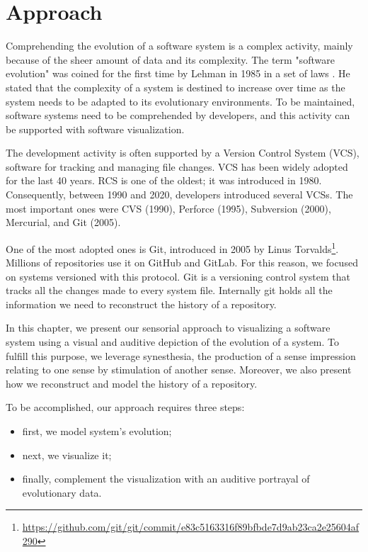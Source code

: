 
\chapter[Approach]{Approach}
\graphicspath{ {images/approach} }

Comprehending the evolution of a software system is a complex activity, mainly because of the sheer amount of data and its complexity. 
The term "software evolution" was coined for the first time by Lehman in 1985 in a set of laws \cite{Lehman1985}.
He stated that the complexity of a system is destined to increase over time as the system needs to be adapted to its evolutionary environments. 
To be maintained, software systems need to be comprehended by developers, and this activity can be supported with software visualization. 

The development activity is often supported by a Version Control System (VCS), software for tracking and managing file changes. VCS has been widely adopted for the last 40 years. RCS is one of the oldest; it was introduced in 1980. Consequently, between 1990 and 2020, developers introduced several VCSs. The most important ones were CVS (1990), Perforce (1995), Subversion (2000), Mercurial, and Git (2005).

One of the most adopted ones is Git, introduced in 2005 by Linus Torvalds\footnote{\url{https://github.com/git/git/commit/e83c5163316f89bfbde7d9ab23ca2e25604af290}}. Millions of repositories use it on GitHub and GitLab. 
For this reason, we focused on systems versioned with this protocol.
Git is a versioning control system that tracks all the changes made to every system file. 
Internally git holds all the information we need to reconstruct the history of a repository. 

In this chapter, we present our sensorial approach to visualizing a software system using a visual and auditive depiction of the evolution of a system. 
To fulfill this purpose, we leverage synesthesia, the production of a sense impression relating to one sense by stimulation of another sense.
Moreover, we also present how we reconstruct and model the history of a repository. 

To be accomplished, our approach requires three steps: 
\begin{itemize}
    \item first, we model system's evolution; 
    \item next, we visualize it;
    \item finally, complement the visualization with an auditive portrayal of evolutionary data. 
\end{itemize}

